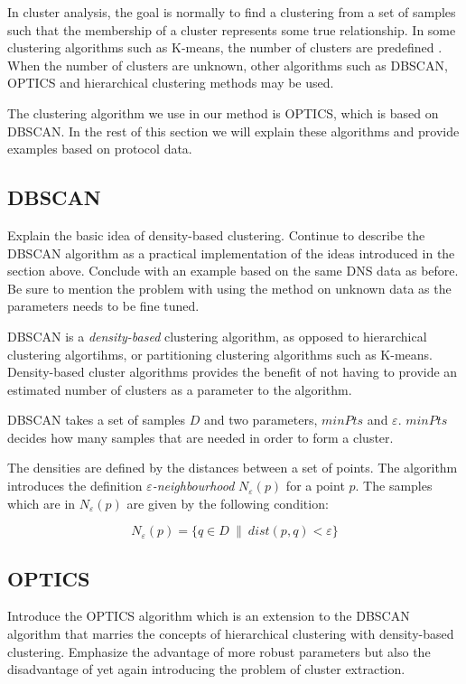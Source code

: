 \documentclass[a4paper]{report}
\begin{document}
In cluster analysis, the goal is normally to find a clustering from a
set of samples such that the membership of a cluster represents some true
relationship. In some clustering algorithms such as K-means, the number of
clusters are predefined \cite{macqueen67}.
When the number of clusters are unknown, other algorithms such as DBSCAN,
OPTICS and hierarchical clustering methods may be used.

The clustering algorithm we use in our method is OPTICS, which is based on
DBSCAN. In the rest of this section we will explain these algorithms and
provide examples based on protocol data.

\subsection{DBSCAN}
Explain the basic idea of density-based clustering. Continue to describe the
DBSCAN algorithm as a practical implementation of the ideas introduced in the
section above. Conclude with an example based on the same DNS data as before.
Be sure to mention the problem with using the method on unknown data as the
parameters needs to be fine tuned.

DBSCAN is a \textit{density-based} clustering algorithm, as opposed to
hierarchical clustering algortihms, or partitioning clustering algorithms such
as K-means. Density-based cluster algorithms provides the benefit of not
having to provide an estimated number of clusters as a parameter to the
algorithm.

DBSCAN takes a set of samples $D$ and two parameters, $minPts$ and
$\varepsilon$. $minPts$ decides how many samples that are needed in order to
form a cluster.

The densities are defined by the distances between a set of points.
The algorithm introduces the definition \textit{$\varepsilon$-neighbourhood}
$N_{\varepsilon}(p)$ for a point $p$. The samples which are in 
$N_{\varepsilon}(p)$ are given by the following condition:

\begin{equation}
    N_{\varepsilon}(p) = \{ q \in D ~\|~ dist(p,q) < \varepsilon  \}
    \label{eq:eps}
\end{equation}

\subsection{OPTICS}
Introduce the OPTICS algorithm which is an extension to the DBSCAN algorithm
that marries the concepts of hierarchical clustering with density-based
clustering. Emphasize the advantage of more robust parameters but also the
disadvantage of yet again introducing the problem of cluster extraction.
\end{document}
